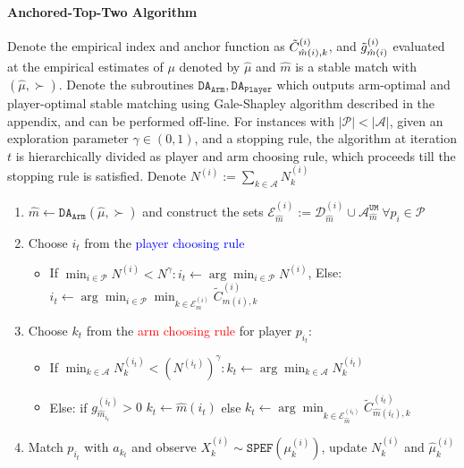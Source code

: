 \documentclass{article}
\newcommand{\UMA}{\mathcal{A}^{\texttt{UM}}}
\begin{document}
\paragraph{Anchored-Top-Two Algorithm} Denote the empirical index and anchor function as $\Tilde{C}^{(i)}_{\hat{m}(i),k}$, and $\Tilde{g}^{(i)}_{\hat{m}(i)}$ evaluated at the empirical estimates of $\mu$ denoted by $\hat{\mu}$ and $\hat{m}$ is a stable match with $(\hat{\mu},\succ)$. Denote the subroutines $\texttt{DA}_{\texttt{Arm}},\texttt{DA}_{\texttt{Player}}$ which outputs arm-optimal and player-optimal stable matching using Gale-Shapley algorithm described in the appendix, and can be performed off-line. For instances with $|\mathcal{P}|<|\mathcal{A}|$, given an exploration parameter $\gamma\in(0,1)$, and a stopping rule, the algorithm at iteration $t$ is hierarchically divided as player and arm choosing rule, which proceeds till the stopping rule is satisfied. Denote $N^{(i)}:=\sum_{k\in\mathcal{A}}N^{(i)}_k$
\begin{enumerate}[leftmargin=*, nosep,noitemsep, topsep=0pt]
    \item $\hat{m}\leftarrow \texttt{DA}_{\texttt{Arm}}(\hat{\mu},\succ)$ and
    construct the sets $\mathcal{E}_{\hat{m}}^{(i)}:=\mathcal{D}_{\hat{m}}^{(i)}\cup \UMA_{\hat{m}}\ \forall p_i\in\mathcal{P}$
    \item Choose $i_t$ from the \textcolor{blue}{player choosing rule}
\begin{itemize}[leftmargin=*, nosep,noitemsep, topsep=0pt,label=\textcolor{blue}{\rule{0.6ex}{0.6ex}}]
\item If $\min_{i\in\mathcal{P}} N^{(i)}<N^{\gamma}: i_t\leftarrow \arg\min_{i\in\mathcal{P}} N^{(i)}$, Else: $i_t\leftarrow \arg\min_{i\in\mathcal{P}} \min_{k\in\mathcal{E}_{m}^{(i)}} \tilde{C}^{(i)}_{m(i),k}$
\end{itemize}
\item Choose $k_t$ from the \textcolor{red}{arm choosing rule} for player $p_{i_t}$: 
\begin{itemize}[leftmargin=*, nosep,noitemsep, topsep=0pt,label=\textcolor{red}{\rule{0.6ex}{0.6ex}}]
\item If $\min_{k\in\mathcal{A}} N_k^{(i_t)}<\left(N^{(i_t)}\right)^{\gamma}: k_t\leftarrow \arg\min_{k\in\mathcal{A}} N^{(i_t)}_k$
\item Else: if $g^{(i_t)}_{\hat{m}_{i_t}}>0$ $k_t\leftarrow  \hat{m}(i_t) $ else $k_t\leftarrow\arg\min_{k\in\mathcal{E}_{\hat{m}}^{(i_t)}} \tilde{C}^{(i_t)}_{\hat{m}(i_t),k}$
\end{itemize}
    \item Match $p_{i_t}$ with $a_{k_t}$ and observe $X^{(i)}_k\sim\texttt{SPEF}(\mu^{(i)}_k)$, update $N^{(i)}_k$ and $\hat{\mu}^{(i)}_k$
\end{enumerate}
\end{document}
